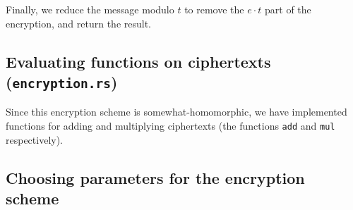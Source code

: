 \documentclass{article}
\begin{document}
Finally, we reduce the message modulo $t$ to remove the $e \cdot t$ part of the encryption, and return the result.

\subsection{Evaluating functions on ciphertexts (\lstinline{encryption.rs})}

Since this encryption scheme is somewhat-homomorphic, we have implemented functions for adding and multiplying ciphertexts (the functions \lstinline{add} and \lstinline{mul} respectively).

\subsection{Choosing parameters for the encryption scheme}
\end{document}
